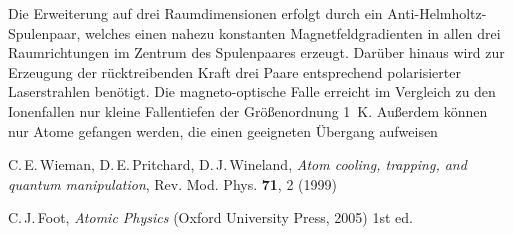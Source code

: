 \documentclass[twocolumn]{revtex4}
\begin{document}
Die Erweiterung auf drei Raumdimensionen erfolgt durch ein Anti-Helmholtz-Spulenpaar, welches einen nahezu konstanten Magnetfeldgradienten in allen drei Raumrichtungen im Zentrum des Spulenpaares erzeugt.
Darüber hinaus wird zur Erzeugung der rücktreibenden Kraft drei Paare entsprechend polarisierter Laserstrahlen benötigt.
Die magneto-optische Falle erreicht im Vergleich zu den Ionenfallen nur kleine Fallentiefen der Größenordnung \SI{1}{K}.
Außerdem können nur Atome gefangen werden, die einen geeigneten Übergang aufweisen


\begin{thebibliography}{}
C.\,E.\,Wieman, D.\,E.\,Pritchard, D.\,J.\,Wineland, {\it Atom cooling, trapping, and quantum manipulation}, Rev. Mod. Phys. \textbf{71}, 2 (1999)

C.\,J.\,Foot, {\it Atomic Physics} (Oxford University Press, 2005) 1st ed.

\end{thebibliography}
\end{document}
